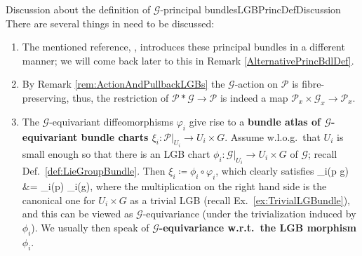 \documentclass[a4paper,oneside,11pt,bibliography=totoc]{scrartcl}
\def\bas#1\eas{\begin{align*}#1\end{align*}}
\theoremstyle{plain}
\theoremstyle{remark}
\theoremstyle{definition}
\begin{document}
\begin{remarks}{Discussion about the definition of $\mathcal{G}$-principal bundles}{LGBPrincDefDiscussion}
There are several things in need to be discussed:
\begin{enumerate}
	\item The mentioned reference, \cite[simplification of the beginning of \S 5.7, page 144f.]{GroupoidBasedPrincipalBundles}, introduces these principal bundles in a different manner; we will come back later to this in Remark \ref{AlternativePrincBdlDef}.
	\item By Remark \ref{rem:ActionAndPullbackLGBs} the $\mathcal{G}$-action on $\mathcal{P}$ is fibre-preserving, thus, the restriction of $\mathcal{P}*\mathcal{G} \to \mathcal{P}$ is indeed a map $\mathcal{P}_x \times \mathcal{G}_x \to \mathcal{P}_x$.
	\item The $\mathcal{G}$-equivariant diffeomorphisms $\varphi_i$ give rise to a \textbf{bundle atlas of $\mathcal{G}$-equivariant bundle charts $\xi_i: \mathcal{P}|_{U_i} \to U_i \times G$}. Assume w.l.o.g.\ that $U_i$ is small enough so that there is an LGB chart $\phi_i: \mathcal{G}|_{U_i} \to U_i \times G$ of $\mathcal{G}$; recall Def.\ \ref{def:LieGroupBundle}. Then $\xi_i \coloneqq \phi_i \circ \varphi_i$, which clearly satisfies
	\bas
	\xi_i(p \cdot g)
	&=
	\xi_i(p) \cdot \phi_i(g),
	\eas
	where the multiplication on the right hand side is the canonical one for $U_i \times G$ as a trivial LGB (recall Ex.\ \ref{ex:TrivialLGBundle}),
	and this can be viewed as $\mathcal{G}$-equivariance (under the trivialization induced by $\phi_i$). We usually then speak of \textbf{$\mathcal{G}$-equivariance w.r.t.\ the LGB morphism $\phi_i$}.
	

\end{enumerate}
\end{remarks}
\end{document}
